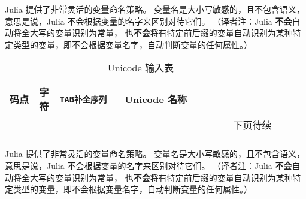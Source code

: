 \documentclass[
  UTF8, %
  a4paper,  %
  oneside,  %
]{ctexbook} %
\begin{document}
Julia 提供了非常灵活的变量命名策略。
变量名是大小写敏感的，且不包含语义，意思是说，Julia 不会根据变量的名字来区别对待它们。 
（译者注：Julia \textbf{不会}自动将全大写的变量识别为常量，
也\textbf{不会}将有特定前后缀的变量自动识别为某种特定类型的变量，即不会根据变量名字，自动判断变量的任何属性。）

% 

\begin{longtable}{p{0.1\linewidth}p{0.05\linewidth}p{0.22\linewidth}p{0.53\linewidth}}
  \caption{Unicode 输入表} \label{unicode-input-table} \\
  \toprule
  \bf{码点} & \bf{字符} & \tt{TAB}\bf{补全序列} & \bf{Unicode 名称} \\
  \hline \endhead
  \multicolumn{4}{r}{下页待续} \\ 
  \midrule \endfoot
  \bottomrule \endlastfoot

  
  
  \bottomrule
\end{longtable}

Julia 提供了非常灵活的变量命名策略。
变量名是大小写敏感的，且不包含语义，意思是说，Julia 不会根据变量的名字来区别对待它们。 
（译者注：Julia \textbf{不会}自动将全大写的变量识别为常量，
也\textbf{不会}将有特定前后缀的变量自动识别为某种特定类型的变量，即不会根据变量名字，自动判断变量的任何属性。）
\end{document}
